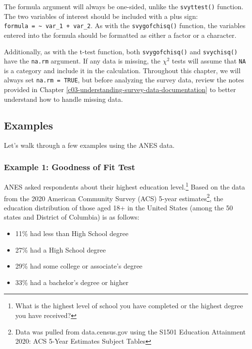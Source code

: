 \documentclass[
]{krantz}
\providecommand{\tightlist}{%
  \setlength{\itemsep}{0pt}\setlength{\parskip}{0pt}}
\begin{document}
The formula argument will always be one-sided, unlike the \texttt{svyttest()} function. The two variables of interest should be included with a plus sign: \texttt{formula\ =\ \textasciitilde{}\ var\_1\ +\ var\_2}. As with the \texttt{svygofchisq()} function, the variables entered into the formula should be formatted as either a factor or a character.

Additionally, as with the t-test function, both \texttt{svygofchisq()} and \texttt{svychisq()} have the \texttt{na.rm} argument. If any data is missing, the \(\chi^2\) tests will assume that \texttt{NA} is a category and include it in the calculation. Throughout this chapter, we will always set \texttt{na.rm\ =\ TRUE}, but before analyzing the survey data, review the notes provided in Chapter \ref{c03-understanding-survey-data-documentation} to better understand how to handle missing data.

\hypertarget{stattest-chi-examples}{%
\subsection{Examples}\label{stattest-chi-examples}}

Let's walk through a few examples using the ANES data.

\hypertarget{stattest-chi-ex1}{%
\subsubsection*{Example 1: Goodness of Fit Test}\label{stattest-chi-ex1}}


ANES asked respondents about their highest education level.\footnote{What is the highest level of school you have completed or the highest degree you have received?} Based on the data from the 2020 American Community Survey (ACS) 5-year estimates\footnote{Data was pulled from data.census.gov using the S1501 Education Attainment 2020: ACS 5-Year Estimates Subject Tables}, the education distribution of those aged 18+ in the United States (among the 50 states and District of Columbia) is as follows:

\begin{itemize}
\tightlist
\item
  11\% had less than High School degree
\item
  27\% had a High School degree
\item
  29\% had some college or associate's degree
\item
  33\% had a bachelor's degree or higher
\end{itemize}
\end{document}
